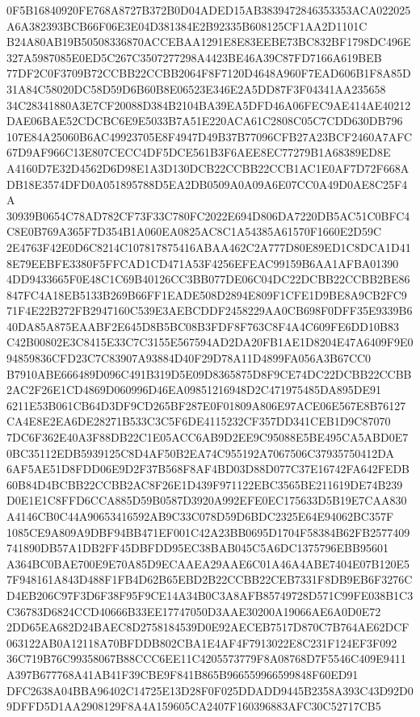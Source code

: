 \documentclass[UTF8,fontset=fandol,zihao=-4,a4paper]{ctexart}
\begin{document}
{{0F5B16840920FE768A8727B372B0D04ADED15AB3839472846353353ACA022025A6A382393BCB66F06E3E04D381384E2B92335B608125CF1AA2D1101C
B24A80AB19B50508336870ACCEBAA1291E8E83EEBE73BC832BF1798DC496E327A5987085E0ED5C267C3507277298A4423BE46A39C87FD7166A619BEB
77DF2C0F3709B72CCBB22CCBB2064F8F7120D4648A960F7EAD606B1F8A85D31A84C58020DC58D59D6B60B8E06523E346E2A5DD87F3F04341AA235658
34C28341880A3E7CF20088D384B2104BA39EA5DFD46A06FEC9AE414AE40212DAE06BAE52CDCBC6E9E5033B7A51E220ACA61C2808C05C7CDD630DB796
107E84A25060B6AC49923705E8F4947D49B37B77096CFB27A23BCF2460A7AFC67D9AF966C13E807CECC4DF5DCE561B3F6AEE8EC77279B1A68389ED8E
A4160D7E32D4562D6D98E1A3D130DCB22CCBB22CCB1AC1E0AF7D72F668ADB18E3574DFD0A051895788D5EA2DB0509A0A09A6E07CC0A49D0AE8C25F4A
30939B0654C78AD782CF73F33C780FC2022E694D806DA7220DB5AC51C0BFC4C8E0B769A365F7D354B1A060EA0825AC8C1A54385A61570F1660E2D59C
2E4763F42E0D6C8214C107817875416ABAA462C2A777D80E89ED1C8DCA1D418E79EEBFE3380F5FFCAD1CD471A53F4256EFEAC99159B6AA1AFBA01390
4DD9433665F0E48C1C69B40126CC3BB077DE06C04DC22DCBB22CCBB2BE86847FC4A18EB5133B269B66FF1EADE508D2894E809F1CFE1D9BE8A9CB2FC9
71F4E22B272FB2947160C539E3AEBCDDF2458229AA0CB698F0DFF35E9339B640DA85A875EAABF2E645D8B5BC08B3FDF8F763C8F4A4C609FE6DD10B83
C42B00802E3C8415E33C7C3155E567594AD2DA20FB1AE1D8204E47A6409F9E094859836CFD23C7C83907A93884D40F29D78A11D4899FA056A3B67CC0
B7910ABE666489D096C491B319D5E09D8365875D8F9CE74DC22DCBB22CCBB2AC2F26E1CD4869D060996D46EA09851216948D2C471975485DA895DE91
6211E53B061CB64D3DF9CD265BF287E0F01809A806E97ACE06E567E8B76127CA4E8E2EA6DE28271B533C3C5F6DE4115232CF357DD341CEB1D9C87070
7DC6F362E40A3F88DB22C1E05ACC6AB9D2EE9C95088E5BE495CA5ABD0E70BC35112EDB5939125C8D4AF50B2EA74C955192A7067506C37935750412DA
6AF5AE51D8FDD06E9D2F37B568F8AF4BD03D88D077C37E16742FA642FEDB60B84D4BCBB22CCBB2AC8F26E1D439F971122EBC3565BE211619DE74B239
D0E1E1C8FFD6CCA885D59B0587D3920A992EFE0EC175633D5B19E7CAA830A4146CB0C44A90653416592AB9C33C078D59D6BDC2325E64E94062BC357F
1085CE9A809A9DBF94BB471EF001C42A23BB0695D1704F58384B62FB2577409741890DB57A1DB2FF45DBFDD95EC38BAB045C5A6DC1375796EBB95601
A364BC0BAE700E9E70A85D9ECAAEA29AAE6C01A46A4ABE7404E07B120E57F948161A843D488F1FB4D62B65EBD2B22CCBB22CEB7331F8DB9EB6F3276C
D4EB206C97F3D6F38F95F9CE14A34B0C3A8AFB85749728D571C99FE038B1C3C36783D6824CCD40666B33EE17747050D3AAE30200A19066AE6A0D0E72
2DD65EA682D24BAEC8D2758184539D0E92AECEB7517D870C7B764AE62DCF063122AB0A12118A70BFDDB802CBA1E4AF4F7913022E8C231F124EF3F092
36C719B76C99358067B88CCC6EE11C4205573779F8A08768D7F5546C409E9411A397B677768A41AB41F39CBE9F841B865B966559966599848F60ED91
DFC2638A04BBA96402C14725E13D28F0F025DDADD9445B2358A393C43D92D09DFFD5D1AA2908129F8A4A159605CA2407F160396883AFC30C52717CB5
}}
\end{document}
